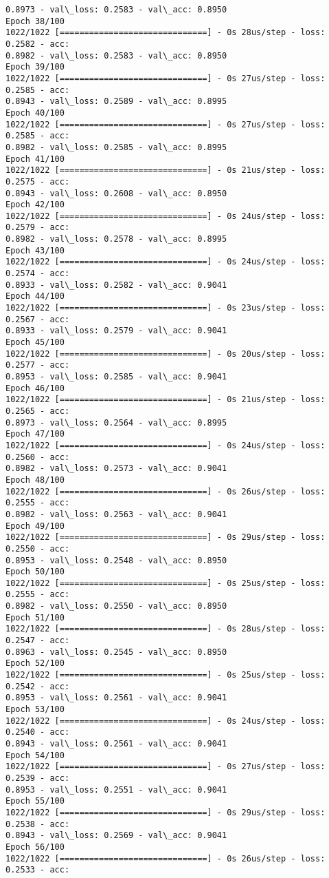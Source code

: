 \documentclass[11pt]{article}
\begin{document}
\begin{Verbatim}[commandchars=\\\{\}]
0.8973 - val\_loss: 0.2583 - val\_acc: 0.8950
Epoch 38/100
1022/1022 [==============================] - 0s 28us/step - loss: 0.2582 - acc:
0.8982 - val\_loss: 0.2583 - val\_acc: 0.8950
Epoch 39/100
1022/1022 [==============================] - 0s 27us/step - loss: 0.2585 - acc:
0.8943 - val\_loss: 0.2589 - val\_acc: 0.8995
Epoch 40/100
1022/1022 [==============================] - 0s 27us/step - loss: 0.2585 - acc:
0.8982 - val\_loss: 0.2585 - val\_acc: 0.8995
Epoch 41/100
1022/1022 [==============================] - 0s 21us/step - loss: 0.2575 - acc:
0.8943 - val\_loss: 0.2608 - val\_acc: 0.8950
Epoch 42/100
1022/1022 [==============================] - 0s 24us/step - loss: 0.2579 - acc:
0.8982 - val\_loss: 0.2578 - val\_acc: 0.8995
Epoch 43/100
1022/1022 [==============================] - 0s 24us/step - loss: 0.2574 - acc:
0.8933 - val\_loss: 0.2582 - val\_acc: 0.9041
Epoch 44/100
1022/1022 [==============================] - 0s 23us/step - loss: 0.2567 - acc:
0.8933 - val\_loss: 0.2579 - val\_acc: 0.9041
Epoch 45/100
1022/1022 [==============================] - 0s 20us/step - loss: 0.2577 - acc:
0.8953 - val\_loss: 0.2585 - val\_acc: 0.9041
Epoch 46/100
1022/1022 [==============================] - 0s 21us/step - loss: 0.2565 - acc:
0.8973 - val\_loss: 0.2564 - val\_acc: 0.8995
Epoch 47/100
1022/1022 [==============================] - 0s 24us/step - loss: 0.2560 - acc:
0.8982 - val\_loss: 0.2573 - val\_acc: 0.9041
Epoch 48/100
1022/1022 [==============================] - 0s 26us/step - loss: 0.2555 - acc:
0.8982 - val\_loss: 0.2563 - val\_acc: 0.9041
Epoch 49/100
1022/1022 [==============================] - 0s 29us/step - loss: 0.2550 - acc:
0.8953 - val\_loss: 0.2548 - val\_acc: 0.8950
Epoch 50/100
1022/1022 [==============================] - 0s 25us/step - loss: 0.2555 - acc:
0.8982 - val\_loss: 0.2550 - val\_acc: 0.8950
Epoch 51/100
1022/1022 [==============================] - 0s 28us/step - loss: 0.2547 - acc:
0.8963 - val\_loss: 0.2545 - val\_acc: 0.8950
Epoch 52/100
1022/1022 [==============================] - 0s 25us/step - loss: 0.2542 - acc:
0.8953 - val\_loss: 0.2561 - val\_acc: 0.9041
Epoch 53/100
1022/1022 [==============================] - 0s 24us/step - loss: 0.2540 - acc:
0.8943 - val\_loss: 0.2561 - val\_acc: 0.9041
Epoch 54/100
1022/1022 [==============================] - 0s 27us/step - loss: 0.2539 - acc:
0.8953 - val\_loss: 0.2551 - val\_acc: 0.9041
Epoch 55/100
1022/1022 [==============================] - 0s 29us/step - loss: 0.2538 - acc:
0.8943 - val\_loss: 0.2569 - val\_acc: 0.9041
Epoch 56/100
1022/1022 [==============================] - 0s 26us/step - loss: 0.2533 - acc:

\end{Verbatim}
\end{document}
